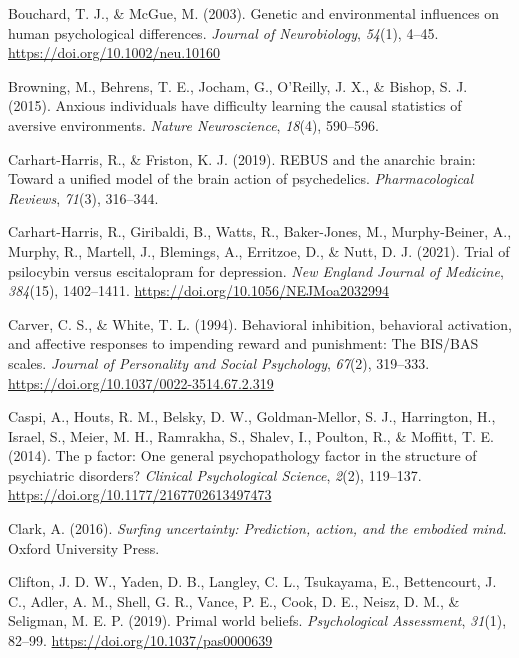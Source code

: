 \documentclass[
  jou,
  floatsintext,
  longtable,
  nolmodern,
  notxfonts,
  notimes,
  12pt,
  colorlinks=true,linkcolor=blue,citecolor=blue,urlcolor=blue]{apa7}
\newlength{\cslhangindent}
\newenvironment{CSLReferences}[2] %
 {\begin{list}{}{%
  \setlength{\itemindent}{0pt}
  \setlength{\leftmargin}{0pt}
  \setlength{\parsep}{0pt}
  \ifodd #1
   \setlength{\leftmargin}{\cslhangindent}
   \setlength{\itemindent}{-1\cslhangindent}
  \fi
  \setlength{\itemsep}{#2\baselineskip}}}
 {\end{list}}
\begin{document}
\begin{CSLReferences}{1}{0}
Bouchard, T. J., \& McGue, M. (2003). Genetic and environmental
influences on human psychological differences. \emph{Journal of
Neurobiology}, \emph{54}(1), 4--45.
\url{https://doi.org/10.1002/neu.10160}

Browning, M., Behrens, T. E., Jocham, G., O'Reilly, J. X., \& Bishop, S.
J. (2015). Anxious individuals have difficulty learning the causal
statistics of aversive environments. \emph{Nature Neuroscience},
\emph{18}(4), 590--596.

Carhart-Harris, R., \& Friston, K. J. (2019). {REBUS} and the anarchic
brain: Toward a unified model of the brain action of psychedelics.
\emph{Pharmacological Reviews}, \emph{71}(3), 316--344.

Carhart-Harris, R., Giribaldi, B., Watts, R., Baker-Jones, M.,
Murphy-Beiner, A., Murphy, R., Martell, J., Blemings, A., Erritzoe, D.,
\& Nutt, D. J. (2021). Trial of psilocybin versus escitalopram for
depression. \emph{New England Journal of Medicine}, \emph{384}(15),
1402--1411. \url{https://doi.org/10.1056/NEJMoa2032994}

Carver, C. S., \& White, T. L. (1994). Behavioral inhibition, behavioral
activation, and affective responses to impending reward and punishment:
The {BIS/BAS} scales. \emph{Journal of Personality and Social
Psychology}, \emph{67}(2), 319--333.
\url{https://doi.org/10.1037/0022-3514.67.2.319}

Caspi, A., Houts, R. M., Belsky, D. W., Goldman-Mellor, S. J.,
Harrington, H., Israel, S., Meier, M. H., Ramrakha, S., Shalev, I.,
Poulton, R., \& Moffitt, T. E. (2014). The p factor: One general
psychopathology factor in the structure of psychiatric disorders?
\emph{Clinical Psychological Science}, \emph{2}(2), 119--137.
\url{https://doi.org/10.1177/2167702613497473}

Clark, A. (2016). \emph{Surfing uncertainty: Prediction, action, and the
embodied mind}. Oxford University Press.

Clifton, J. D. W., Yaden, D. B., Langley, C. L., Tsukayama, E.,
Bettencourt, J. C., Adler, A. M., Shell, G. R., Vance, P. E., Cook, D.
E., Neisz, D. M., \& Seligman, M. E. P. (2019). Primal world beliefs.
\emph{Psychological Assessment}, \emph{31}(1), 82--99.
\url{https://doi.org/10.1037/pas0000639}


\end{CSLReferences}
\end{document}
